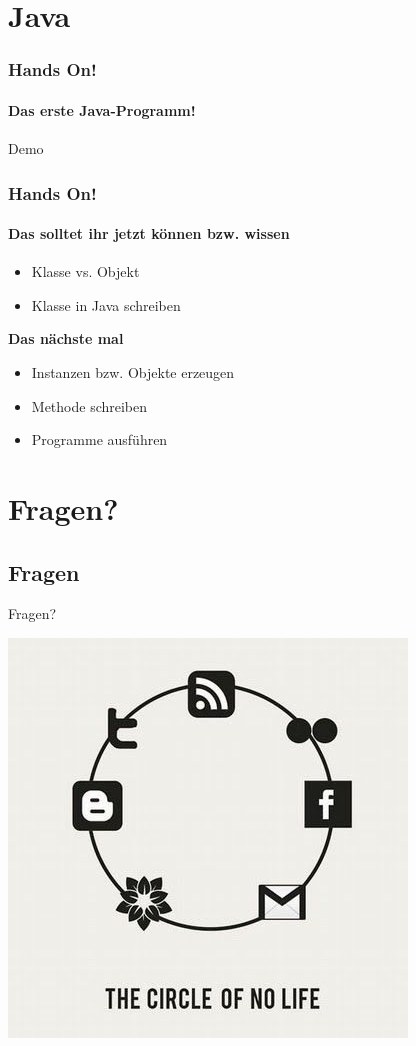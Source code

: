 \documentclass[18pt]{beamer}
\begin{document}
\section{Java}
\begin{frame}
	\frametitle{Hands On!}
	\framesubtitle{Das erste Java-Programm!}
	
	Demo
	
\end{frame}

\begin{frame}
	\frametitle{Hands On!}
	\framesubtitle{Das solltet ihr jetzt können bzw. wissen}
	
	\begin{itemize}
		\item Klasse vs. Objekt
		\item Klasse in Java schreiben
	\end{itemize}

	\pause
	\textbf{Das nächste mal}
	\begin{itemize}
		\item Instanzen bzw. Objekte erzeugen
		\item Methode schreiben
		\item Programme ausführen
	\end{itemize}
\end{frame}


\section{Fragen?}
\subsection*{Fragen} %
\begin{frame}	
	\begin{center}
		\huge{Fragen?}
	\end{center}
\end{frame}



\begin{frame}[full]
\includegraphics[scale=0.55]{bilder/comics/September-25-2011-18-44-59-aa71ce1bd67502c27bc56a6b8d724897.jpeg}
\end{frame}
\end{document}
